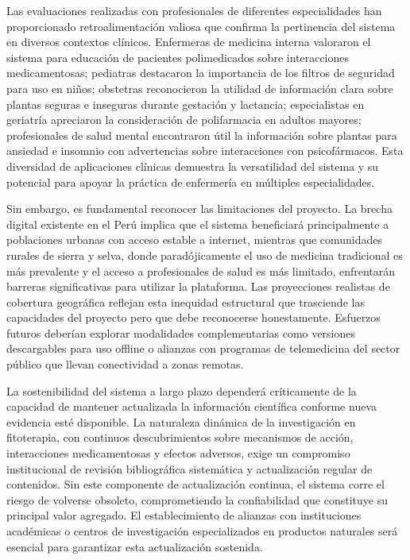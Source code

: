 \documentclass[12pt,a4paper]{article}
\begin{document}
Las evaluaciones realizadas con profesionales de diferentes especialidades han proporcionado retroalimentación valiosa que confirma la pertinencia del sistema en diversos contextos clínicos. Enfermeras de medicina interna valoraron el sistema para educación de pacientes polimedicados sobre interacciones medicamentosas; pediatras destacaron la importancia de los filtros de seguridad para uso en niños; obstetras reconocieron la utilidad de información clara sobre plantas seguras e inseguras durante gestación y lactancia; especialistas en geriatría apreciaron la consideración de polifarmacia en adultos mayores; profesionales de salud mental encontraron útil la información sobre plantas para ansiedad e insomnio con advertencias sobre interacciones con psicofármacos. Esta diversidad de aplicaciones clínicas demuestra la versatilidad del sistema y su potencial para apoyar la práctica de enfermería en múltiples especialidades.

Sin embargo, es fundamental reconocer las limitaciones del proyecto. La brecha digital existente en el Perú implica que el sistema beneficiará principalmente a poblaciones urbanas con acceso estable a internet, mientras que comunidades rurales de sierra y selva, donde paradójicamente el uso de medicina tradicional es más prevalente y el acceso a profesionales de salud es más limitado, enfrentarán barreras significativas para utilizar la plataforma. Las proyecciones realistas de cobertura geográfica reflejan esta inequidad estructural que trasciende las capacidades del proyecto pero que debe reconocerse honestamente. Esfuerzos futuros deberían explorar modalidades complementarias como versiones descargables para uso offline o alianzas con programas de telemedicina del sector público que llevan conectividad a zonas remotas.

La sostenibilidad del sistema a largo plazo dependerá críticamente de la capacidad de mantener actualizada la información científica conforme nueva evidencia esté disponible. La naturaleza dinámica de la investigación en fitoterapia, con continuos descubrimientos sobre mecanismos de acción, interacciones medicamentosas y efectos adversos, exige un compromiso institucional de revisión bibliográfica sistemática y actualización regular de contenidos. Sin este componente de actualización continua, el sistema corre el riesgo de volverse obsoleto, comprometiendo la confiabilidad que constituye su principal valor agregado. El establecimiento de alianzas con instituciones académicas o centros de investigación especializados en productos naturales será esencial para garantizar esta actualización sostenida.
\end{document}
